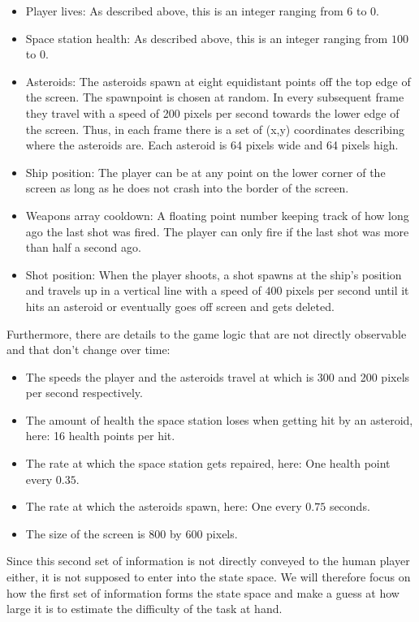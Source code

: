 \documentclass[a4paper,10pt]{article}
\begin{document}
\begin{itemize}
 \item Player lives: As described above, this is an integer ranging from $6$ to $0$.
 \item Space station health: As described above, this is an integer ranging from $100$ to $0$.
 \item Asteroids: The asteroids spawn at eight equidistant points off the top edge of the screen. The spawnpoint is chosen at random. In every subsequent frame they travel with a speed of 200 pixels per second towards the lower edge of the screen. Thus, in each frame there is a set of (x,y) coordinates describing where the asteroids are. Each asteroid is 64 pixels wide and 64 pixels high.
 \item Ship position: The player can be at any point on the lower corner of the screen as long as he does not crash into the border of the screen.
 \item Weapons array cooldown: A floating point number keeping track of how long ago the last shot was fired. The player can only fire if the last shot was more than half a second ago.
 \item Shot position: When the player shoots, a shot spawns at the ship's position and travels up in a vertical line with a speed of $400$ pixels per second until it hits an asteroid or eventually goes off screen and gets deleted.
\end{itemize}
Furthermore, there are details to the game logic that are not directly observable and that don't change over time:
\begin{itemize}
 \item The speeds the player and the asteroids travel at which is 300 and 200 pixels per second respectively.
 \item The amount of health the space station loses when getting hit by an asteroid, here: 16 health points per hit.
 \item The rate at which the space station gets repaired, here: One health point every $0.35$.
 \item The rate at which the asteroids spawn, here: One every $0.75$ seconds.
 \item The size of the screen is 800 by 600 pixels.
\end{itemize}

Since this second set of information is not directly conveyed to the human player either, it is not supposed to enter into the state space.
We will therefore focus on how the first set of information forms the state space and make a guess at how large it is to estimate the difficulty of the task at hand.
\end{document}
